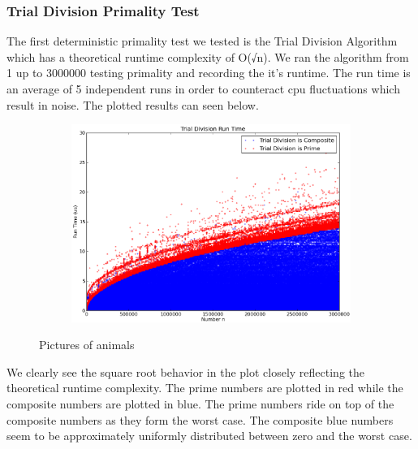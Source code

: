 \documentclass[compressed,final,notitlepage,narroweqnarray,inline,twoside,]{ieee}
\begin{document}
\subsubsection{Trial Division Primality Test}
The first deterministic primality test we tested is the Trial Division Algorithm which has a theoretical runtime complexity of O(√n). We ran the algorithm from 1 up to 3000000 testing primality and recording the it’s runtime. The run time is an average of 5 independent runs in order to counteract cpu fluctuations which result in noise. The plotted results can seen below. 
\begin{figure}[H]
        \centering
        \begin{subfigure}[b]{0.5\textwidth}
                \includegraphics[width=\textwidth]{../images/isPrime}
                \label{fig:gull}
        \end{subfigure}
        \caption{Pictures of animals}\label{fig:animals}
\end{figure}
We clearly see the square root behavior in the plot closely reflecting the theoretical runtime complexity. The prime numbers are plotted in red while the composite numbers are plotted in blue. The prime numbers ride on top of the composite numbers as they form the worst case. The composite blue numbers seem to be approximately uniformly distributed between zero and the worst case.
\end{document}
